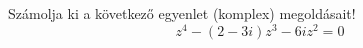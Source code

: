 \documentclass[11pt]{scrartcl}
\begin{document}
Számolja ki a következő egyenlet (komplex) megoldásait!
\[
	z^4 - (2 - 3i) z^3 - 6i z^2 = 0
\]
\end{document}
